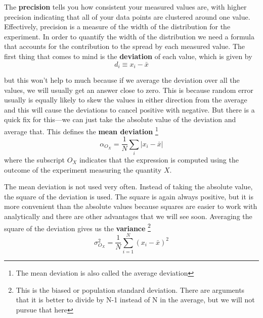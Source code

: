 The {\bf precision} tells you how consistent your measured values are, with higher precision indicating that all of your data points are clustered around one value. Effectively, precision is a measure of the width of the distribution for the experiment. In order to quantify the width of the distribution we need a formula that accounts for the contribution to the spread by each measured value. The first thing that comes to mind is the {\bf deviation} of each value, which is given by 
\begin{equation} d_i \equiv x_i - \bar{x} \end{equation}

but this won't help to much because if we average the deviation over all the values, we will usually get an answer close to zero. This is because random error usually is equally likely to skew the values in either direction from the average and this will cause the deviations to cancel positive with negative. But there is a quick fix for this---we can just take the absolute value of the deviation and average that. This defines the {\bf mean deviation} \footnote{The mean deviation is also called the average deviation}
\begin{equation} \alpha_{O_X} = \frac{1}{N} \sum_i |x_i - \bar{x}| \end{equation}
where the subscript $O_X$ indicates that the expression is computed using the outcome of the experiment measuring the quantity $X$.

The mean deviation is not used very often. Instead of taking the absolute value, the square of the deviation is used. The square is again always positive, but it is more convenient than the absolute values because squares are easier to work with analytically and there are other advantages that we will see soon. Averaging the square of the deviation gives us the {\bf variance} 
\footnote{This is the biased or population standard deviation. There are arguments that it is better to divide by N-1 instead of N in the average, but we will not pursue that here}
\begin{equation}\sigma^2_{O_X} = \frac{1}{N} \sum_{i=1}^N \left(x_i - \bar{x}\right)^2  \end{equation}
%

